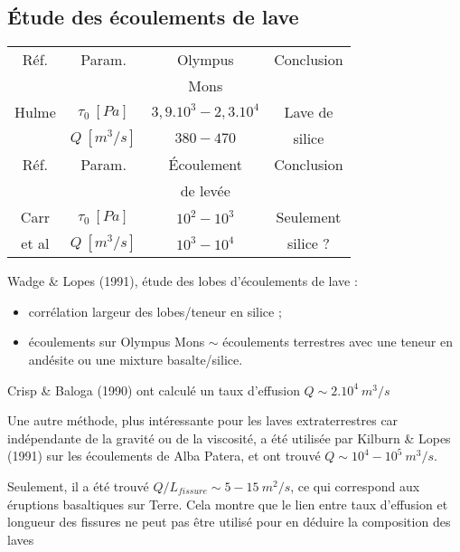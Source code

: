\documentclass[10pt,a4paper, twocolumns]{article}
\begin{document}
\subsection{Étude des écoulements de lave}

	\begin{table}[!h]
		\centering
		\begin{tabular}{|c||c|c|c|}
			\hline
			Réf.       &   Param.       & Olympus             & Conclusion  \\
			           &                & Mons                &             \\
			\hline
			Hulme      & $\tau_0\ [Pa]$ & $3,9.10^3-2,3.10^4$ & Lave de     \\
			           & $Q\ [m^3/s]$   & $380 - 470      $   & silice      \\
			\hline
			\hline
			Réf.       &  Param.        & Écoulement          & Conclusion  \\
			           &                & de levée            &             \\
			\hline
			Carr       & $\tau_0\ [Pa]$ & $10^2-10^3$         & Seulement   \\
			et al      & $Q\ [m^3/s]$   & $10^3-10^4$         & silice ?    \\
			\hline
		\end{tabular}
	\end{table}

	Wadge \& Lopes (1991), étude des lobes d'écoulements de lave :
	\begin{itemize}
		\item corrélation largeur des lobes/teneur en silice ;
		\item écoulements sur Olympus Mons $\sim$ écoulements terrestres avec une teneur en andésite ou une mixture basalte/silice.
	\end{itemize}

	Crisp \& Baloga (1990) ont calculé un taux d'effusion $Q\sim2.10^4\ m^3/s$
	
	Une autre méthode, plus intéressante pour les laves extraterrestres car indépendante de la gravité ou de la viscosité, a été utilisée par Kilburn \& Lopes (1991) sur les écoulements de Alba Patera, et ont trouvé $Q \sim 10^4-10^5\ m^3/s$.
	
	Seulement, il a été trouvé $Q/L_{fissure} \sim 5-15\ m^2/s$, ce qui correspond aux éruptions basaltiques sur Terre. Cela montre que le lien entre taux d'effusion et longueur des fissures ne peut pas être utilisé pour en déduire la composition des laves
	
\end{document}
